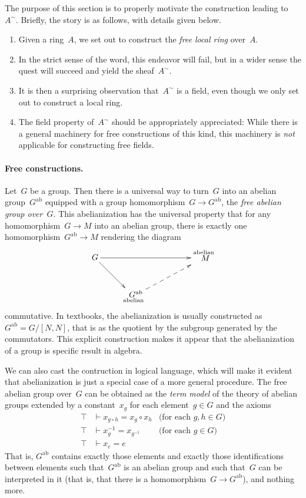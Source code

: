 \documentclass{ws-rv9x6}
\newcommand{\ab}{\mathrm{ab}}
\renewcommand{\_}{\mathpunct{.}}
\newcommand{\?}{\,{:}\,}
\begin{document}
The purpose of this section is to properly motivate the construction
leading to~$A^\sim$. Briefly, the story is as follows, with details given
below.
\begin{enumerate}
\item Given a ring~$A$, we set out to construct the \emph{free local ring}
over~$A$.
\item In the strict sense of the word, this endeavor will fail, but in a wider
sense the quest will succeed and yield the sheaf~$A^\sim$.
\item It is then a surprising observation that~$A^\sim$ is a field, even though
we only set out to construct a local ring.
\item The field property of~$A^\sim$ should be appropriately appreciated: While
there is a general machinery for free constructions of this kind, this
machinery is \emph{not} applicable for constructing free fields.
\end{enumerate}

\paragraph{Free constructions.}
Let~$G$ be a group. Then there is a universal way to turn~$G$ into an abelian
group~$G^\ab$ equipped with a group homomorphism~$G \to G^\ab$, the \emph{free
abelian group over~$G$}. This abelianization has the universal property that
for any homomorphism~$G \to M$ into an abelian group, there is exactly one
homomorphism~$G^\ab \to M$ rendering the diagram
\[ \xymatrix{
  G \ar[rd] \ar[rrr] &&& {\substack{\text{abelian}\\\text{\normalsize$\!M$}\\\phantom{\text{abelian}}}} \\
  & {\substack{\text{\normalsize$G^\ab$}\\\text{abelian}}} \ar@{-->}_[@!29]{}[rru]
} \]
commutative. In textbooks, the abelianization is usually constructed as~$G^\ab
= G/[N,N]$, that is as the quotient by the subgroup generated by the
commutators. This explicit construction makes it appear that the abelianization
of a group is specific result in algebra.

We can also cast the contruction in logical language, which will make it
evident that abelianization is just a special case of a more general procedure.
The free abelian group over~$G$ can be obtained as the \emph{term model} of the
theory of abelian groups extended by a constant~$x_g$ for each element~$g \in
G$ and the axioms
\begin{align*}
  \top &\vdash x_{g \circ h} = x_g \circ x_h & \text{(for each~$g,h \in G$)} \\
  \top &\vdash x_g^{-1} = x_{g^{-1}} & \text{(for each~$g \in G$)} \\
  \top &\vdash x_e = e
\end{align*}
That is, $G^\ab$ contains exactly those elements and exactly those
identifications between elements such that~$G^\ab$ is an abelian group and such
that~$G$ can be interpreted in it (that is, that there is a homomorphism~$G \to
G^\ab$), and nothing more.
\end{document}
